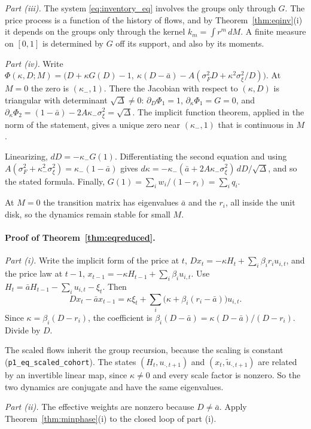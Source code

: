 \documentclass[12pt]{article}
\theoremstyle{definition}
\theoremstyle{remark}
\begin{document}
\emph{Part (iii).} The system \eqref{eq:inventory_eq} involves the groups only through $G$. The price process is a function of the history of flows, and by Theorem~\ref{thm:eqinv}(i) it depends on the groups only through the kernel $k_m=\int r^m\,dM$. A finite measure on $[0,1]$ is determined by $G$ off its support, and also by its moments.

\emph{Part (iv).} Write $\Phi(\kappa,D;M)=\bigl(D+\kappa G(D)-1,\ \kappa(D-\bar a)-A(\sigma_F^2D+\kappa^2\sigma_\xi^2/D)\bigr)$. At $M=0$ the zero is $(\kappa_-,1)$. There the Jacobian with respect to $(\kappa,D)$ is triangular with determinant $\sqrt\Delta\ne0$: $\partial_D\Phi_1=1$, $\partial_\kappa\Phi_1=G=0$, and $\partial_\kappa\Phi_2=(1-\bar a)-2A\kappa_-\sigma_\xi^2=\sqrt\Delta$. The implicit function theorem, applied in the norm of the statement, gives a unique zero near $(\kappa_-,1)$ that is continuous in $M$.

Linearizing, $dD=-\kappa_-G(1)$. Differentiating the second equation and using $A(\sigma_F^2+\kappa_-^2\sigma_\xi^2)=\kappa_-(1-\bar a)$ gives $d\kappa=-\kappa_-(\bar a+2A\kappa_-\sigma_\xi^2)\,dD/\sqrt\Delta$, and so the stated formula. Finally, $G(1)=\sum_iw_i/(1-r_i)=\sum_iq_i$.

At $M=0$ the transition matrix has eigenvalues $\bar a$ and the $r_i$, all inside the unit disk, so the dynamics remain stable for small $M$.

\paragraph{Proof of Theorem~\ref{thm:eqreduced}.}
\emph{Part (i).} Write the implicit form of the price at $t$, $Dx_t=-\kappa H_t+\sum_i\beta_ir_iu_{i,t}$, and the price law at $t-1$, $x_{t-1}=-\kappa H_{t-1}+\sum_i\beta_iu_{i,t}$. Use $H_t=\bar aH_{t-1}-\sum_iu_{i,t}-\xi_t$. Then
\[
 Dx_t-\bar ax_{t-1}=\kappa\xi_t+\sum_i\bigl(\kappa+\beta_i(r_i-\bar a)\bigr)u_{i,t}.
\]
Since $\kappa=\beta_i(D-r_i)$, the coefficient is $\beta_i(D-\bar a)=\kappa(D-\bar a)/(D-r_i)$. Divide by $D$.

The scaled flows inherit the group recursion, because the scaling is constant (\nolinkurl{p1_eq_scaled_cohort}). The states $(H_t,u_{\cdot,t+1})$ and $(x_t,\tilde u_{\cdot,t+1})$ are related by an invertible linear map, since $\kappa\ne0$ and every scale factor is nonzero. So the two dynamics are conjugate and have the same eigenvalues.

\emph{Part (ii).} The effective weights are nonzero because $D\ne\bar a$. Apply Theorem~\ref{thm:minphase}(i) to the closed loop of part (i).
\end{document}
